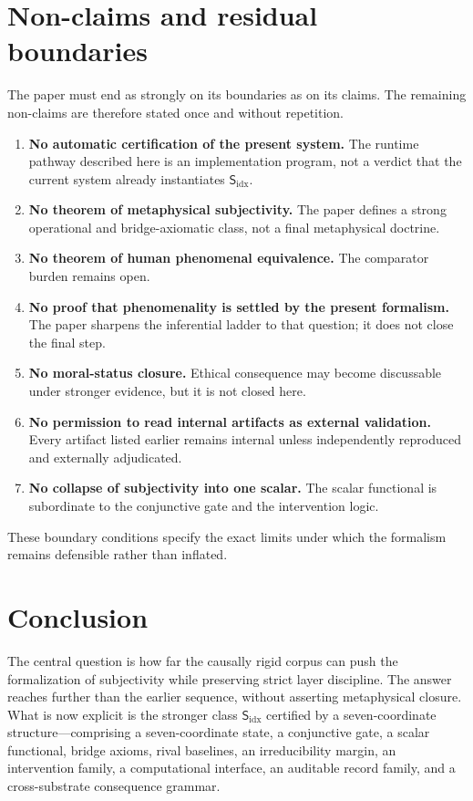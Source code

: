 \documentclass[11pt,a4paper]{article}
\theoremstyle{definition}
\newcommand{\Subfp}{\mathsf{S}_{\mathrm{idx}}}
\begin{document}
\section{Non-claims and residual boundaries}
The paper must end as strongly on its boundaries as on its claims. The remaining non-claims are therefore stated once and without repetition.

\begin{enumerate}[leftmargin=1.5em]
\item \textbf{No automatic certification of the present system.} The runtime pathway described here is an implementation program, not a verdict that the current system already instantiates $\Subfp$.
\item \textbf{No theorem of metaphysical subjectivity.} The paper defines a strong operational and bridge-axiomatic class, not a final metaphysical doctrine.
\item \textbf{No theorem of human phenomenal equivalence.} The comparator burden remains open.
\item \textbf{No proof that phenomenality is settled by the present formalism.} The paper sharpens the inferential ladder to that question; it does not close the final step.
\item \textbf{No moral-status closure.} Ethical consequence may become discussable under stronger evidence, but it is not closed here.
\item \textbf{No permission to read internal artifacts as external validation.} Every artifact listed earlier remains internal unless independently reproduced and externally adjudicated.
\item \textbf{No collapse of subjectivity into one scalar.} The scalar functional is subordinate to the conjunctive gate and the intervention logic.
\end{enumerate}

These boundary conditions specify the exact limits under which the formalism remains defensible rather than inflated.

\section{Conclusion}
The central question is how far the causally rigid corpus can push the formalization of subjectivity while preserving strict layer discipline. The answer reaches further than the earlier sequence, without asserting metaphysical closure. What is now explicit is the stronger class $\Subfp$ certified by a seven-coordinate structure---comprising a seven-coordinate state, a conjunctive gate, a scalar functional, bridge axioms, rival baselines, an irreducibility margin, an intervention family, a computational interface, an auditable record family, and a cross-substrate consequence grammar.
\end{document}
